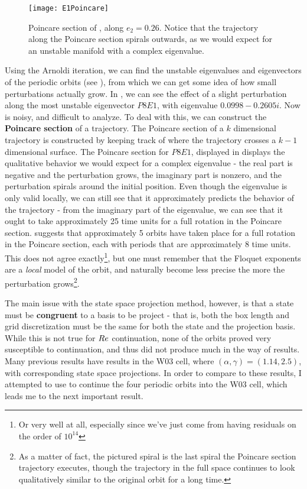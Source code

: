 \begin{figure}[h!]
\centerline{\texttt{[image: E1Poincare]}}
\caption{Poincare section of , along $e_2 = 0.26$. Notice that the trajectory along the Poincare section spirals outwards, as we would expect for an unstable manifold with a complex eigenvalue.}\label{fig:E1Poincare}
\end{figure}
 Using the Arnoldi iteration, we can find the unstable eigenvalues and eigenvectors of the periodic orbits (see ), from which we can get some idea of how small perturbations actually grow. In , we can see the effect of a slight perturbation along the most unstable eigenvector $P8E1$, with eigenvalue $0.0998 - 0.2605 i$. Now  is noisy, and difficult to analyze. To deal with this, we can construct the {\bf Poincare section} of a trajectory. The Poincare section of a $k$ dimensional trajectory is constructed by keeping track of where the trajectory crosses a $k-1$ dimensional surface. The Poincare section for  $P8E1$, displayed in  displays the qualitative behavior we would expect for a complex eigenvalue - the real part is negative and the perturbation grows, the imaginary part is nonzero, and the perturbation spirals around the initial position. Even though the eigenvalue is only valid locally, we can still see that it approximately predicts the behavior of the trajectory - from the imaginary part of the eigenvalue, we can see that it ought to take approximately 25 time units for a full rotation in the Poincare section.  suggests that approximately 5 orbits have taken place for a full rotation in the Poincare section, each with periods that are approximately 8 time units. This does not agree exactly\footnote{Or very well at all, especially since we've just come from having residuals on the order of $10^{14}$}, but one must remember that the Floquet exponents are a \emph{local} model of the orbit, and naturally become less precise the more the perturbation grows\footnote{As a matter of fact, the pictured spiral is the last spiral the Poincare section trajectory executes, though the trajectory in the full space continues to look qualitatively similar to the original orbit for a long time.}.   




 The main issue with the state space projection method, however, is that a state must be {\bf congruent} to a basis to be project - that is, both the box length and grid discretization must be the same for both the state and the projection basis. While this is not true for $Re$ continuation, none of the orbits proved very susceptible to \ReN continuation, and thus did not produce much in the way of results. Many previous results have results in the W03 cell, where $(\alpha,\gamma) = (1.14,2.5)$, with corresponding state space projections. In order to compare to these results, I attempted to use  to continue the four periodic orbits into the W03 cell, which leads me to the next important result.

